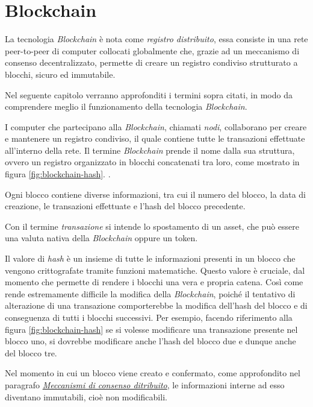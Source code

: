 \section{Blockchain}
\label{sec:blockchain}

La tecnologia \textit{Blockchain} è nota come \textit{registro distribuito}, essa consiste in una rete peer-to-peer di computer collocati globalmente che, grazie ad un meccanismo di consenso decentralizzato, permette di creare un registro condiviso strutturato a blocchi, sicuro ed immutabile. \cite{binance-blockchain}

Nel seguente capitolo verranno approfonditi i termini sopra citati, in modo da comprendere meglio il funzionamento della tecnologia \textit{Blockchain}.

I computer che partecipano alla \textit{Blockchain}, chiamati \textit{nodi}, collaborano per creare e mantenere un registro condiviso, il quale contiene tutte le transazioni effettuate all'interno della rete. Il termine \textit{Blockchain} prende il nome dalla sua struttura, ovvero un registro organizzato in blocchi concatenati tra loro, come mostrato in figura \ref{fig:blockchain-hash}. \cite{binance-blockchain}.

Ogni blocco contiene diverse informazioni, tra cui il numero del blocco, la data di creazione, le transazioni effettuate e l'hash del blocco precedente. \cite{binance-block} 

Con il termine \textit{transazione} si intende lo spostamento di un asset, che può essere una valuta nativa della \textit{Blockchain} oppure un token. \cite{ibm-blockchain} 

Il valore di \textit{hash} è un insieme di tutte le informazioni presenti in un blocco che vengono crittografate tramite funzioni matematiche. Questo valore è cruciale, dal momento che permette di rendere i blocchi una vera e propria catena. Così come rende estremamente difficile la modifica della \textit{Blockchain}, poiché il tentativo di alterazione di una transazione comporterebbe la modifica dell'hash del blocco e di conseguenza di tutti i blocchi successivi. \cite{bitsmap-block}
Per esempio, facendo riferimento alla figura \ref{fig:blockchain-hash} se si volesse modificare una transazione presente nel blocco uno, si dovrebbe modificare anche l'hash del blocco due e dunque anche del blocco tre.

Nel momento in cui un blocco viene creato e confermato, come approfondito nel paragrafo \hyperref[sec:consensoDistribuito]{\textit{Meccanismi di consenso ditribuito}}, le informazioni interne ad esso diventano immutabili, cioè non modificabili. \cite{binance-block}

